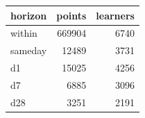 \begin{tabular}{lrr}
\toprule
horizon & points & learners \\
\midrule
within & 669904 & 6740 \\
sameday & 12489 & 3731 \\
d1 & 15025 & 4256 \\
d7 & 6885 & 3096 \\
d28 & 3251 & 2191 \\
\bottomrule
\end{tabular}
